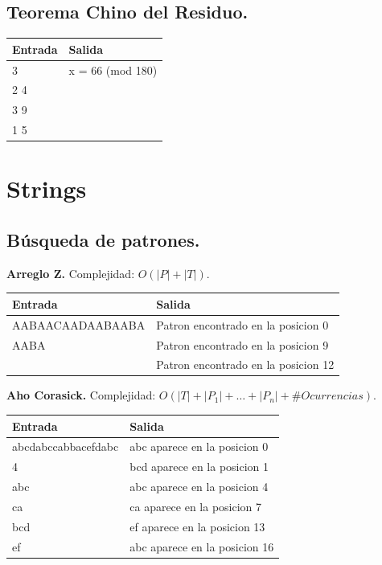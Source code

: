 \documentclass[11pt, letterpaper, twoside]{article}
\begin{document}
\subsection{Teorema Chino del Residuo.}



\begin{tabular}{|p{7cm}|p{7cm}|}
\hline
\textbf{Entrada} & \textbf{Salida}\\ \hline
3   & x = 66 (mod 180)\\
2 4 & \\ 
3 9 & \\ 
1 5 & \\ \hline
\end{tabular}

\newpage

\section{Strings}

\subsection{Búsqueda de patrones.}

\textbf{Arreglo Z.} Complejidad: $O(|P| + |T|)$.



\begin{tabular}{|p{7cm}|p{7cm}|}
\hline
\textbf{Entrada} & \textbf{Salida}\\ \hline
AABAACAADAABAABA & Patron encontrado en la posicion 0\\
AABA             & Patron encontrado en la posicion 9\\
                 & Patron encontrado en la posicion 12\\ \hline
\end{tabular}\bigskip

\textbf{Aho Corasick.} Complejidad: $O(|T| + |P_1| + \ldots + |P_n| + \#Ocurrencias)$.



\begin{tabular}{|p{7cm}|p{7cm}|}
\hline
\textbf{Entrada} & \textbf{Salida}\\ \hline
abcdabccabbacefdabc & abc aparece en la posicion 0\\
4                   & bcd aparece en la posicion 1\\
abc                 & abc aparece en la posicion 4\\
ca                  & ca aparece en la posicion 7\\
bcd                 & ef aparece en la posicion 13\\
ef                  & abc aparece en la posicion 16\\ \hline
\end{tabular}
\end{document}
